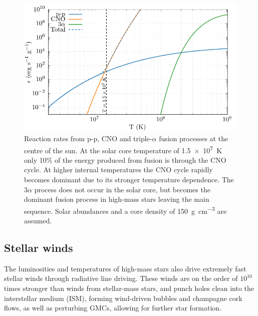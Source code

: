 \begin{figure}
  \centering
  \includegraphics{assets/reaction-rate/reaction-solar.pdf}
  \caption[Reaction rates at the center of the sun]{Reaction rates from p-p, CNO and triple-$\alpha$ fusion processes at the centre of the sun. At the solar core temperature of \SI{1.5e7}{\kelvin} only 10\% of the energy produced from fusion is through the CNO cycle. At higher internal temperatures the CNO cycle rapidly becomes dominant due to its stronger temperature dependence. The $3\alpha$ process does not occur in the solar core, but becomes the dominant fusion process in high-mass stars leaving the main sequence. Solar abundances and a core density of \SI{150}{\gram\per\centi\metre\cubed} are assumed.}
\end{figure}


\subsection{Stellar winds}

The luminosities and temperatures of high-mass stars also drive extremely fast stellar winds through radiative line driving.
These winds are on the order of $10^{10}$ times stronger than winds from stellar-mass stars, and punch holes clean into the interstellar medium (ISM), forming wind-driven bubbles and champagne cork flows, as well as perturbing GMCs, allowing for further star formation.

